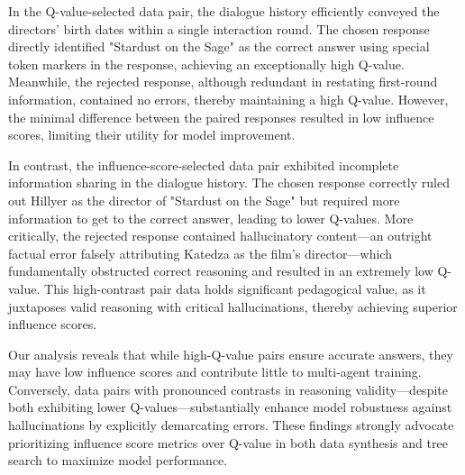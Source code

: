 In the Q-value-selected data pair, the dialogue history efficiently conveyed the directors' birth dates within a single interaction round. The chosen response directly identified "Stardust on the Sage" as the correct answer using special token markers in the response, achieving an exceptionally high Q-value. Meanwhile, the rejected response, although redundant in restating first-round information, contained no errors, thereby maintaining a high Q-value. However, the minimal difference between the paired responses resulted in low influence scores, limiting their utility for model improvement.  

In contrast, the influence-score-selected data pair exhibited incomplete information sharing in the dialogue history. The chosen response correctly ruled out Hillyer as the director of "Stardust on the Sage" but required more information to get to the correct answer, leading to lower Q-values. More critically, the rejected response contained hallucinatory content—an outright factual error falsely attributing Katedza as the film’s director—which fundamentally obstructed correct reasoning and resulted in an extremely low Q-value. This high-contrast pair data holds significant pedagogical value, as it juxtaposes valid reasoning with critical hallucinations, thereby achieving superior influence scores.  

Our analysis reveals that while high-Q-value pairs ensure accurate answers, they may have low influence scores and contribute little to multi-agent training. Conversely, data pairs with pronounced contrasts in reasoning validity—despite both exhibiting lower Q-values—substantially enhance model robustness against hallucinations by explicitly demarcating errors. These findings strongly advocate prioritizing influence score metrics over Q-value in both data synthesis and tree search to maximize model performance.
